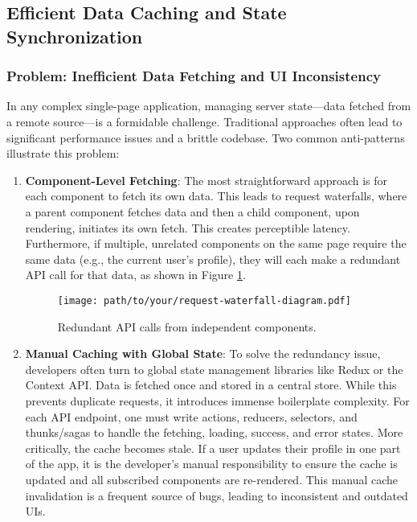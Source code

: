 \subsection{Efficient Data Caching and State Synchronization}
\label{subsec:efficient_caching}

\subsubsection{Problem: Inefficient Data Fetching and UI Inconsistency}
In any complex single-page application, managing server state—data fetched from a remote source—is a formidable challenge. Traditional approaches often lead to significant performance issues and a brittle codebase. Two common anti-patterns illustrate this problem:

\begin{enumerate}
    \item \textbf{Component-Level Fetching}: The most straightforward approach is for each component to fetch its own data. This leads to request waterfalls, where a parent component fetches data and then a child component, upon rendering, initiates its own fetch. This creates perceptible latency. Furthermore, if multiple, unrelated components on the same page require the same data (e.g., the current user's profile), they will each make a redundant API call for that data, as shown in Figure \ref{fig:request_waterfall}.

    \begin{figure}[h]
        \centering
        \texttt{[image: path/to/your/request-waterfall-diagram.pdf]}
        \caption{Redundant API calls from independent components.}
        \label{fig:request_waterfall}
    \end{figure}

    \item \textbf{Manual Caching with Global State}: To solve the redundancy issue, developers often turn to global state management libraries like Redux or the Context API. Data is fetched once and stored in a central store. While this prevents duplicate requests, it introduces immense boilerplate complexity. For each API endpoint, one must write actions, reducers, selectors, and thunks/sagas to handle the fetching, loading, success, and error states. More critically, the cache becomes stale. If a user updates their profile in one part of the app, it is the developer's manual responsibility to ensure the cache is updated and all subscribed components are re-rendered. This manual cache invalidation is a frequent source of bugs, leading to inconsistent and outdated UIs.
\end{enumerate}

